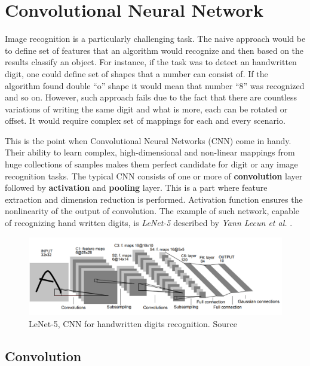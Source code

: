 \chapter{Convolutional Neural Network}
\label{cha:conv}

Image recognition is a particularly challenging task. The naive approach would be to define set of features that an algorithm would recognize and then based on the results classify an object. For instance, if the task was to detect an handwritten digit, one could define set of shapes that a number can consist of. If the algorithm found double ``o'' shape it would mean that number ``8'' was recognized and so on. However, such approach fails due to the fact that there are countless variations of writing the same digit and what is more, each can be rotated or offset. It would require complex set of mappings for each and every scenario.

This is the point when Convolutional Neural Networks (CNN) come in handy. Their ability to learn complex, high-dimensional and non-linear mappings from huge collections of samples makes them perfect candidate for digit or any image recognition tasks. The typical CNN consists of one or more of \textbf{convolution} layer followed by \textbf{activation} and \textbf{pooling} layer. This is a part where feature extraction and dimension reduction is performed. Activation function ensures the nonlinearity of the output of convolution. The example of such network, capable of recognizing hand written digits, is \emph{LeNet-5} described by \emph{Yann Lecun et al.} \cite{GradientBasedLearningDigitRec}.

\begin{figure}
    \centering
    \includegraphics[width=14cm]{img/LeNet-5.png}
    \caption{LeNet-5, CNN for handwritten digits recognition. Source \cite{GradientBasedLearningDigitRec}}
    \label{fig:le-net-5}
\end{figure}

\section{Convolution}
\label{sec:convolution}


